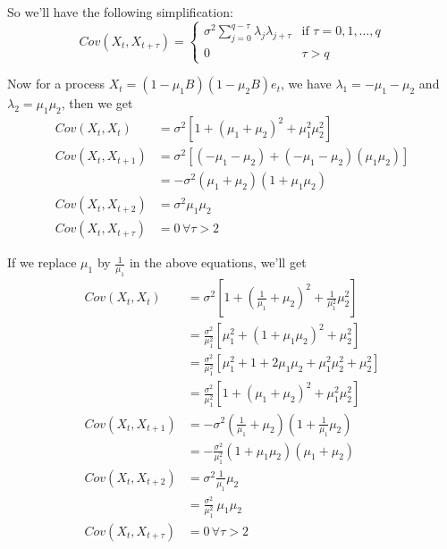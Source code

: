 \documentclass[12pt, oneside]{article}
\begin{document}
\begin{enumerate}
{    So we'll have the following simplification:
    \begin{equation}
        Cov(X_t, X_{t+\tau}) = \begin{cases}
            \sigma^2 \sum_{j=0}^{q-\tau} \lambda_j \lambda_{j+\tau} & \text{if } \tau = 0, 1, \ldots, q \\
            0 & \tau > q
        \end{cases}
    \end{equation}

    Now for a process \(X_t = (1 - \mu_1 B)(1 - \mu_2 B)e_t\), we have \(\lambda_1 = -\mu_1 - \mu_2\)
    and \(\lambda_2 = \mu_1 \mu_2\), then we get
    \begin{align*}
        Cov(X_t, X_t) &= \sigma^2 [1 + (\mu_1 + \mu_2)^2 + \mu_1^2 \mu_2^2] \\
        Cov(X_t, X_{t+1}) &= \sigma^2 [(-\mu_1-\mu_2) + (-\mu_1-\mu_2)(\mu_1 \mu_2)] \\
            &= - \sigma^2 (\mu_1 + \mu_2) (1 + \mu_1 \mu_2) \\
        Cov(X_t, X_{t+2}) &= \sigma^2 \mu_1 \mu_2 \\
        Cov(X_t, X_{t+\tau}) &= 0 \,\forall \tau > 2
    \end{align*}

    If we replace \(\mu_1\) by \(\frac{1}{\mu_1}\) in the above equations, we'll get
    \begin{align*}
        Cov(X_t, X_t) &= \sigma^2 \left[1 + \left(\frac{1}{\mu_1} + \mu_2\right)^2 + \frac{1}{\mu_1^2} \mu_2^2\right] \\
            &= \frac{\sigma^2}{\mu_1^2} \left[\mu_1^2 + \left(1 + \mu_1 \mu_2\right)^2 + \mu_2^2\right] \\
            &= \frac{\sigma^2}{\mu_1^2} \left[\mu_1^2 + 1 + 2 \mu_1 \mu_2 + \mu_1^2 \mu_2^2 + \mu_2^2\right] \\
            &= \frac{\sigma^2}{\mu_1^2} \left[1 + (\mu_1 + \mu_2)^2 + \mu_1^2 \mu_2^2\right] \\
        Cov(X_t, X_{t+1}) &= - \sigma^2 \left(\frac{1}{\mu_1} + \mu_2\right) \left(1 + \frac{1}{\mu_1} \mu_2\right) \\
            &= - \frac{\sigma^2}{\mu_1^2} \left(1 + \mu_1 \mu_2\right) \left(\mu_1 + \mu_2\right) \\
        Cov(X_t, X_{t+2}) &= \sigma^2 \frac{1}{\mu_1} \mu_2 \\
        &= \frac{\sigma^2}{\mu_1^2} ~\mu_1 \mu_2 \\
        Cov(X_t, X_{t+\tau}) &= 0 \,\forall \tau > 2
    \end{align*}

}
\end{enumerate}
\end{document}
